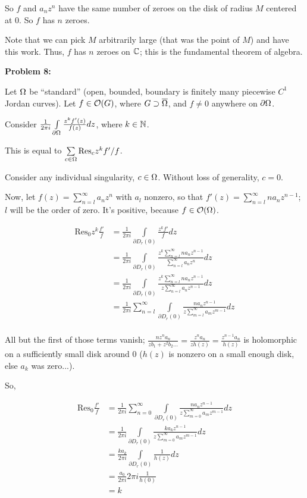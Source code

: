 \documentclass[a4paper,12pt]{article}
\begin{document}
So $f$ and $a_nz^n$ have the same number of zeroes on the disk of radius $M$ centered at $0$. So $f$ has $n$ zeroes.

Note that we can pick $M$ arbitrarily large (that was the point of $M$) and have this work. Thus, $f$ has $n$ zeroes on $\mathbb{C}$; this is the fundamental theorem of algebra.

\shunt

{\bf Problem 8:}

Let $\Omega$ be ``standard'' (open, bounded, boundary is finitely many piecewise $C^1$ Jordan curves). Let $f \in \mathcal{O}(G)$, where $G \supset \overline{\Omega}$, and $f \neq 0$ anywhere on $\partial \Omega$.

Consider $\frac{1}{2\pi i} \int\limits_{\partial \Omega} \frac{z^k f'(z)}{f(z)} dz$, where $k \in \mathbb{N}$.

This is equal to $\sum\limits_{c \in \Omega} \text{Res}_c z^k f'/f$.

Consider any individual singularity, $c \in \Omega$. Without loss of generality, $c=0$. %

Now, let $f(z) = \sum\limits_{n=l}^\infty a_nz^n$ with $a_l$ nonzero, so that $f'(z) = \sum\limits_{n=l}^\infty na_nz^{n-1}$; $l$ will be the order of zero. It's positive, because $f \in \mathcal{O}(\Omega)$.

\begin{align*} %
\text{Res}_0 z^k\frac{f'}{f}  &= \frac{1}{2\pi i} \int\limits_{ \partial D_r(0)} \frac{z^kf'}{f} dz\\
&= \frac{1}{2\pi i} \int\limits_{ \partial D_r(0)} \frac{z^k\sum\limits_{n=l}^\infty na_nz^{n-1}}{\sum\limits_{n=l}^\infty a_nz^n} dz\\
&= \frac{1}{2\pi i} \int\limits_{ \partial D_r(0)} \frac{z^k\sum\limits_{n=l}^\infty na_nz^{n-1}}{z\sum\limits_{n=l}^\infty a_{n}z^{n-1}} dz\\
&= \frac{1}{2\pi i} \sum\limits_{n=l}^\infty \int\limits_{ \partial D_r(0)} \frac{na_nz^{n-1}}{z\sum\limits_{m=l}^\infty a_{m}z^{m-1}} dz\\
\end{align*} 

All but the first of those terms vanish; $\frac{nz^na_n}{zb_1 + z^2b_2 \ldots } = \frac{z^na_n}{zh(z)} = \frac{z^{n-1}a_n}{h(z)}$ is holomorphic on a sufficiently small disk around $0$ ($h(z)$ is nonzero on a small enough disk, else $a_k$ was zero...).

So, 

\begin{align*}
\text{Res}_0 \frac{f'}{f}  &= \frac{1}{2\pi i} \sum\limits_{n=0}^\infty \int\limits_{ \partial D_r(0)} \frac{na_nz^{n-1}}{z\sum\limits_{m=0}^\infty a_{m}z^{m-1}} dz\\
&= \frac{1}{2\pi i} \int\limits_{ \partial D_r(0)} \frac{ka_kz^{n-1}}{z\sum\limits_{m=0}^\infty a_{m}z^{m-1}} dz\\
&= \frac{ka_k}{2\pi i}  \int\limits_{ \partial D_r(0)} \frac{1}{h(z)} dz\\
&= \frac{a_0}{2\pi i}  2 \pi i \frac{1}{h(0)}\\
&= k
\end{align*}
\end{document}
